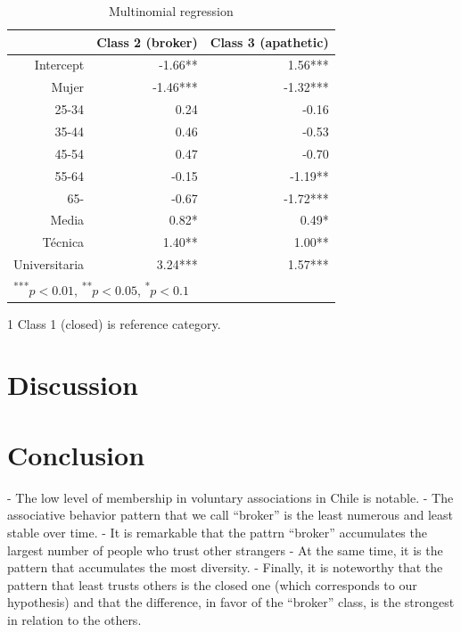 \begin{table}[H]
\centering
\begin{threeparttable}
\caption{\label{demo-table} Multinomial regression}
\begin{tabular}{rrr}
  \hline
 & Class 2 (broker) & Class 3 (apathetic)\\ 
  \hline
Intercept & -1.66** & 1.56*** \\ 
  Mujer & -1.46*** & -1.32*** \\ 
  25-34 & 0.24 & -0.16 \\ 
  35-44 & 0.46 & -0.53 \\ 
  45-54 & 0.47 & -0.70 \\ 
  55-64 & -0.15 & -1.19** \\ 
  65- & -0.67 & -1.72*** \\ 
  Media & 0.82* & 0.49* \\ 
  Técnica & 1.40** & 1.00** \\ 
  Universitaria & 3.24*** & 1.57*** \\ 
   \hline
\multicolumn{3}{l}{\textsuperscript{***}$p<0.01$, 
  \textsuperscript{**}$p<0.05$, 
  \textsuperscript{*}$p<0.1$}
\end{tabular}
\begin{tablenotes}
    \item[1] Class 1 (closed) is reference category.
  \end{tablenotes}
\end{threeparttable}
\end{table}




\section{Discussion}

\section{Conclusion}

- The low level of membership in voluntary associations in Chile is notable.
- The associative behavior pattern that we call “broker” is the least numerous and least stable over time.
- It is remarkable that the pattrn “broker” accumulates the largest number of people who trust other strangers
- At the same time, it is the pattern that accumulates the most diversity.
- Finally, it is noteworthy that the pattern that least trusts others is the
closed one (which corresponds to our hypothesis) and that the difference, in favor of the “broker” class, is the strongest in relation to the others.

